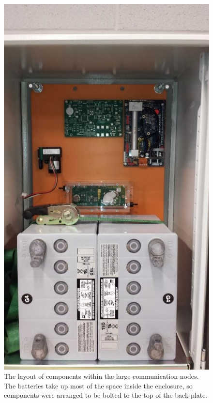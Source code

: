 \documentclass[journal]{IEEEtran}
\begin{document}
\begin{figure}[!t]
	\centering
		\includegraphics[width=\columnwidth,keepaspectratio]{commbuild1.jpg}
		\caption[Components within the large communication nodes]{The layout of components within the large communication nodes.  The batteries take up most of the space inside the enclosure, so components were arranged to be bolted to the top of the back plate.\label{fig:commbuild1}}
\end{figure}
\end{document}
